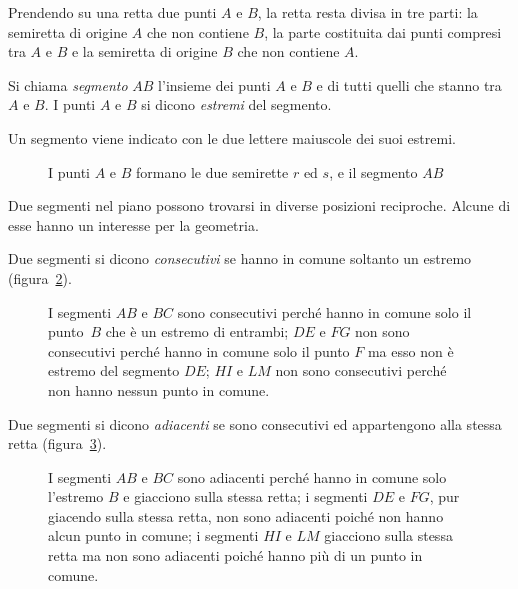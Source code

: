 Prendendo su una retta due punti $A$ e $B$, la retta resta divisa in 
tre parti: la semiretta di origine $A$ che non contiene $B$, la parte 
costituita dai punti compresi tra $A$ e $B$ e la semiretta di origine 
$B$ che non contiene $A$.

\begin{definizione}
Si chiama \emph{segmento} $AB$ l'insieme dei punti $A$ e $B$ e di 
tutti quelli che stanno tra $A$ e $B$.
I punti $A$ e $B$ si dicono \emph{estremi} del segmento.
\end{definizione}
Un segmento viene indicato con le due lettere maiuscole dei suoi 
estremi.

\begin{inaccessibleblock}
 \begin{figure}[bth]
 \centering 
 \caption{I punti $A$ e $B$ formano le due semirette $r$ ed $s$, e il 
segmento $AB$}\label{fig:1.13}
\end{figure}
\end{inaccessibleblock}

Due segmenti nel piano possono trovarsi in diverse posizioni 
reciproche. Alcune di esse hanno un interesse per la geometria.
\begin{definizione}
Due segmenti si dicono \emph{consecutivi} se hanno in comune soltanto 
un estremo (figura~\ref{fig:1.14}).
\end{definizione}

\begin{inaccessibleblock}
 \begin{figure}[bth]
 \centering 
 \caption{I segmenti $AB$ e $BC$ sono consecutivi perché hanno in 
comune solo il punto~$B$ che è un estremo di entrambi; $DE$ e $FG$ 
non sono consecutivi perché hanno in comune solo il punto $F$ ma esso 
non è estremo del segmento $DE$; $HI$ e $LM$ non sono consecutivi 
perché non hanno nessun punto in comune.}\label{fig:1.14}
\end{figure}
\end{inaccessibleblock}

\begin{definizione}
Due segmenti si dicono \emph{adiacenti} se sono consecutivi ed 
appartengono alla stessa retta (figura~\ref{fig:1.15}).
\end{definizione}

\begin{inaccessibleblock}
 \begin{figure}[tbh]
 \centering 
 \caption{I segmenti $AB$ e $BC$ sono adiacenti perché hanno in 
comune solo l'estremo $B$ e giacciono sulla stessa retta; i segmenti 
$DE$ e $FG$, pur giacendo sulla stessa retta, non sono adiacenti 
poiché non hanno alcun punto in comune; i segmenti $HI$ e $LM$ 
giacciono sulla stessa retta ma non sono adiacenti poiché hanno più 
di un punto in comune.}\label{fig:1.15}
\end{figure}
\end{inaccessibleblock}

